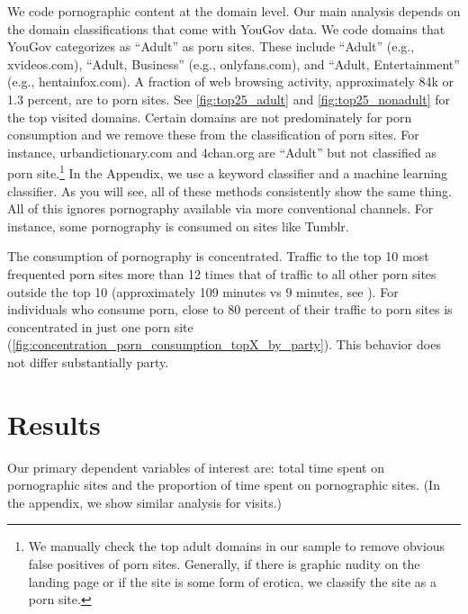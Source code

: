 \documentclass[12pt, letterpaper]{article}
\begin{document}
We code pornographic content at the domain level. 
Our main analysis depends on the domain classifications that come with YouGov data. We code domains that YouGov categorizes as ``Adult'' as porn sites. 
These include ``Adult'' (e.g., xvideos.com), ``Adult, Business'' (e.g., onlyfans.com), and ``Adult, Entertainment'' (e.g., hentainfox.com). 
A fraction of web browsing activity, approximately 84k or 1.3 percent, are to porn sites.
See \cref{fig:top25_adult} and \cref{fig:top25_nonadult} for the top visited domains.
Certain domains are not predominately for porn consumption and we remove these from the classification of porn sites. For instance, urbandictionary.com and 4chan.org are ``Adult'' but not classified as porn site.\footnote{We manually check the top adult domains in our sample to remove obvious false positives of porn sites. Generally, if there is graphic nudity on the landing page or if the site is some form of erotica, we classify the site as a porn site.}
In the Appendix, we use a keyword classifier and a machine learning classifier. As you will see, all of these methods consistently show the same thing. All of this ignores pornography available via more conventional channels. For instance, some pornography is consumed on sites like Tumblr.

The consumption of pornography is concentrated. Traffic to the top 10 most frequented porn sites more than 12 times that of traffic to all other porn sites outside the top 10 (approximately 109 minutes vs 9 minutes, see ). 
For individuals who consume porn, close to 80 percent of their traffic to porn sites is concentrated in just one porn site (\cref{fig:concentration_porn_consumption_topX_by_party}). This behavior does not differ substantially party.

\FloatBarrier
\section*{Results}

Our primary dependent variables of interest are: total time spent on pornographic sites and the proportion of time spent on pornographic sites. (In the appendix, we show similar analysis for visits.) 
\end{document}
